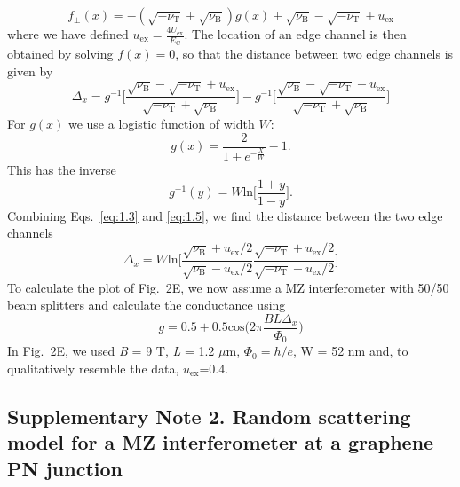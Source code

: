 \documentclass[%
reprint,amsmath,amssymb,aps,prl,superscriptaddress,
twocolumn
]{revtex4-1}
\begin{document}
		\smallskip
		\begin{equation}
		f_\pm(x) = -(\sqrt{-\nu_\mathrm{T}}+\sqrt{\nu_\mathrm{B}})g(x) + \sqrt{\nu_\mathrm{B}}-\sqrt{-\nu_\mathrm{T}} \pm u_\mathrm{ex}
		\end{equation} \smallskip
		where we have defined $u_\mathrm{ex} = \frac{4U_\mathrm{ex}}{E_\mathrm{C}}$.
		The location of an edge channel is then obtained by solving $f(x) = 0$, so that the distance between two edge channels is given by
		\begin{equation}
		\Delta_x = g^{-1} \bigg[ \frac{\sqrt{\nu_\mathrm{B}}-\sqrt{-\nu_\mathrm{T}}+u_\mathrm{ex}}{\sqrt{-\nu_\mathrm{T}}+\sqrt{\nu_\mathrm{B}}} \bigg] - g^{-1}\bigg[\frac{\sqrt{\nu_\mathrm{B}}-\sqrt{-\nu_\mathrm{T}}-u_\mathrm{ex}}{\sqrt{-\nu_\mathrm{T}}+\sqrt{\nu_\mathrm{B}}} \bigg]
		\label{eq:1.3}
		\end{equation}\smallskip
		For $g(x)$ we use a logistic function of width $W$:
		\begin{equation}
		g(x)=\frac{2}{1+e^{-\frac{X}{W}}}-1.
		\end{equation}
		This has the inverse
		\begin{equation}
		g^{-1}(y)=W\mathrm{ln}\bigg[\frac{1+y}{1-y}\bigg].
		\label{eq:1.5}
		\end{equation}
		Combining Eqs.~\ref{eq:1.3} and \ref{eq:1.5}, we find the distance between the two edge channels
		\begin{equation}
		\Delta_x = W \mathrm{ln} \bigg[ \frac{\sqrt{\nu_\mathrm{B}}+u_\mathrm{ex}/2}{\sqrt{\nu_\mathrm{B}}-u_\mathrm{ex}/2}
		\frac{\sqrt{-\nu_\mathrm{T}}+u_\mathrm{ex}/2}{\sqrt{-\nu_\mathrm{T}}-u_\mathrm{ex}/2} \bigg]
		\end{equation}
		To calculate the plot of Fig.~2E, we now assume a MZ interferometer with 50/50 beam splitters and calculate the conductance using
		\begin{equation}
		g = 0.5+0.5 \mathrm{cos} \bigg( 2\pi \frac{B L \Delta_x}{\Phi_0} \bigg)
		\end{equation}
		In Fig.~2E, we used \emph{B} = 9 T, \emph{L} = 1.2 $\mu$m, $\Phi_0 = h/e$, W = 52 nm and, to qualitatively resemble the data, $u_{\mathrm{ex}}$=0.4.
		
		
		\subsection{Supplementary Note 2. Random scattering model for a MZ interferometer at a graphene PN junction}
		
\end{document}
